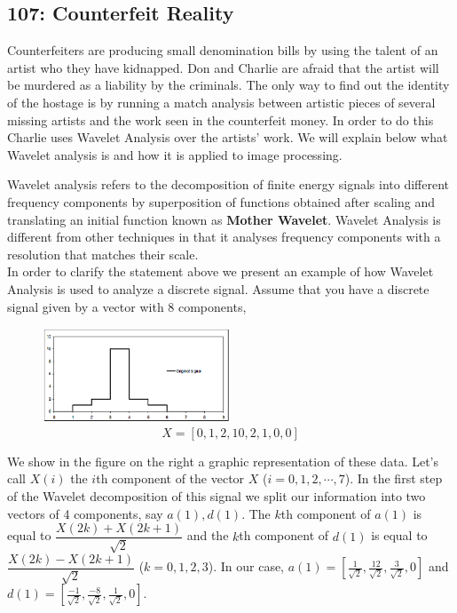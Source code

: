 \newpage
\subsection{107: Counterfeit Reality\label{107}}

Counterfeiters are producing small denomination bills by using the talent of an artist who they have kidnapped. Don and Charlie are afraid that the artist will be murdered as a liability by the criminals. The only way to find out the identity of the hostage is by running a match analysis between artistic pieces of several missing artists and the work seen in the counterfeit money. In order to do this Charlie uses Wavelet Analysis over the artists' work. We will explain below what Wavelet analysis is and how it is applied to image processing. \\


Wavelet analysis refers to the decomposition of finite energy signals into different frequency components by superposition of functions obtained after scaling and translating an initial function known as \textbf{Mother Wavelet}. Wavelet Analysis is different from other techniques in that it analyses frequency components with a resolution that matches their scale. \\

In order to clarify the statement above we present an example of how Wavelet Analysis is used to analyze a discrete signal. Assume that you have a discrete signal given by a vector with 8 components,

	\begin{figure}[H]
	   \centering
	   \includegraphics[width=0.5\textwidth]{season1/107/images/original_signal.png} 
	\[
	X=[0,1,2,10,2,1,0,0]
	\]
	\end{figure}

We show in the figure on the right a graphic representation of these data. Let's call $X(i)$ the $i$th component of the vector $X$ ($i=0,1,2,\cdots,7$). In the first step of the Wavelet decomposition of this signal we split our information into two vectors of 4 components, say $a(1), d(1)$. The $k$th component of $a(1)$ is equal to $\dfrac{X(2k)+X(2k+1)}{\sqrt{2}}$ and the $k$th component of $d(1)$ is equal to $\dfrac{X(2k)-X(2k+1)}{\sqrt{2}}$ ($k=0,1,2,3$). In our case, $a(1)=\left[\frac{1}{\sqrt{2}},\frac{12}{\sqrt{2}},\frac{3}{\sqrt{2}},0\right]$ and $d(1)=\left[\frac{-1}{\sqrt{2}},\frac{-8}{\sqrt{2}},\frac{1}{\sqrt{2}},0\right]$. \\

